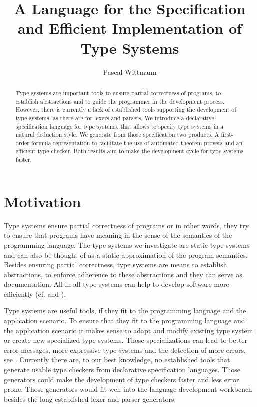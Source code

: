 \documentclass{acm_proc_article-sp}
\begin{document}
\title{A Language for the Specification and Efficient Implementation
  of Type Systems}


\author{
\alignauthor
Pascal Wittmann
}

\maketitle

\begin{abstract}
  Type systems are important tools to ensure partial correctness of
  programs, to establish abstractions and to guide the programmer in
  the development process. However, there is currently a lack of
  established tools supporting the development of type systems, as
  there are for lexers and parsers. We introduce a declarative
  specification language for type systems, that allows to specify type
  systems in a natural deduction style. We generate from those
  specification two products. A first-order formula representation to
  facilitate the use of automated theorem provers and an efficient
  type checker. Both results aim to make the development cycle for
  type systems faster.
 \end{abstract}

\section{Motivation}
Type systems ensure partial correctness of programs or in other words,
they try to ensure that programs have meaning in the sense of the
semantics of the programming language. The type systems we investigate
are static type systems and can also be thought of as a static
approximation of the program semantics. Besides ensuring partial
correctness, type systems are means to establish abstractions, to
enforce adherence to these abstractions and they can serve as
documentation. All in all type systems can help to develop software
more efficiently (cf. \cite{Petersen:2014:ECS:2597008.2597152} and
\cite{Mayer:2012:ESI:2384616.2384666}).

Type systems are useful tools, if they fit to the programming language
and the application scenario. To ensure that they fit to the
programming language and the application scenario it makes sense to
adapt and modify existing type system or create new specialized type
systems. Those specializations can lead to better error messages, more
expressive type systems and the detection of more
errors, see \cite{Thiemann02programmabletype}. Currently there are, to our
best knowledge, no established tools that generate usable type
checkers from declarative specification languages. Those generators
could make the development of type checkers faster and less error
prone. Those generators would fit well into the language development
workbench besides the long established lexer and parser generators.
\end{document}
